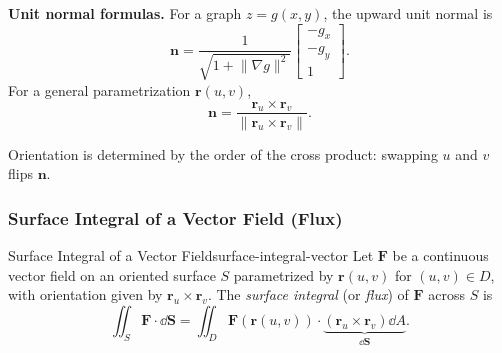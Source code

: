 \begin{center}
\end{center}

\textbf{Unit normal formulas.} For a graph $z = g(x,y)$, the upward unit normal is
\[
  \mathbf{n} = \frac{1}{\sqrt{1+\lVert\nabla g\rVert^2}}
  \begin{bmatrix}
    -g_x \\ -g_y \\ 1
  \end{bmatrix}
  .
\]
For a general parametrization $\mathbf{r}(u,v)$,
\[
  \mathbf{n} = \frac{\mathbf{r}_u\times\mathbf{r}_v}{\lVert\mathbf{r}_u\times\mathbf{r}_v\rVert}.
\]

\begin{remark}
  Orientation is determined by the order of the cross product: swapping $u$ and $v$ flips $\mathbf{n}$.
\end{remark}

\subsubsection{Surface Integral of a Vector Field (Flux)}

\begin{definition}{Surface Integral of a Vector Field}{surface-integral-vector}
  Let $\mathbf{F}$ be a continuous vector field on an oriented surface $S$ parametrized by
  $\mathbf{r}(u,v)$ for $(u,v)\in D$, with orientation given by $\mathbf{r}_u\times\mathbf{r}_v$.
  The \emph{surface integral} (or \emph{flux}) of $\mathbf{F}$ across $S$ is
  \[
    \iint_S \mathbf{F}\cdot\dd{\mathbf{S}}
    = \iint_D \mathbf{F}(\mathbf{r}(u,v))\cdot
    \underbrace{(\mathbf{r}_u\times\mathbf{r}_v)\dd{A}}_{\dd{\mathbf{S}}}.
  \]
\end{definition}

